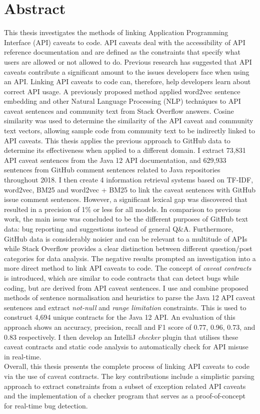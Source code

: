 \chapter*{Abstract}
\vspace{-1em}
This thesis investigates the methods of linking Application Programming Interface (API) caveats to code. API caveats deal with the accessibility of API reference documentation and are defined as the constraints that specify what users are allowed or not allowed to do. Previous research has suggested that API caveats contribute a significant amount to the issues developers face when using an API. Linking API caveats to code can, therefore, help developers learn about correct API usage. A previously proposed method applied word2vec sentence embedding and other Natural Language Processing (NLP) techniques to API caveat sentences and community text from Stack Overflow answers. Cosine similarity was used to determine the similarity of the API caveat and community text vectors, allowing sample code from community text to be indirectly linked to API caveats. This thesis applies the previous approach to GitHub data to determine its effectiveness when applied to a different domain. I extract 73,831 API caveat sentences from the Java 12 API documentation, and 629,933 sentences from GitHub comment sentences related to Java repositories throughout 2018. I then create 4 information retrieval systems based on TF-IDF, word2vec, BM25 and word2vec + BM25 to link the caveat sentences with GitHub issue comment sentences. However, a significant lexical gap was discovered that resulted in a precision of 1\% or less for all models. In comparison to previous work, the main issue was concluded to be the different purposes of GitHub text data: bug reporting and suggestions instead of general Q\&A. Furthermore, GitHub data is considerably noisier and can be relevant to a multitude of APIs while Stack Overflow provides a clear distinction between different question/post categories for data analysis. The negative results prompted an investigation into a more direct method to link API caveats to code. The concept of \textit{caveat contracts} is introduced, which are similar to code contracts that can detect bugs while coding, but are derived from API caveat sentences. I use and combine proposed methods of sentence normalisation and heuristics to parse the Java 12 API caveat sentences and extract \textit{not-null} and \textit{range limitation} constraints. This is used to construct 4,694 unique contracts for the Java 12 API. An evaluation of this approach shows an accuracy, precision, recall and F1 score of 0.77, 0.96, 0.73, and 0.83 respectively. I then develop an IntelliJ \textit{checker} plugin that utilises these caveat contracts and static code analysis to automatically check for API misuse in real-time. \\
Overall, this thesis presents the complete process of linking API caveats to code via the use of caveat contracts. The key contributions include a simplistic parsing approach to extract constraints from a subset of exception related API caveats and the implementation of a checker program that serves as a proof-of-concept for real-time bug detection.
